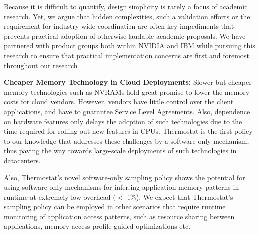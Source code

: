 %
%
Because it is difficult to quantify, design simplicity
is rarely a focus of academic research. Yet, we argue that hidden complexities,
such a validation efforts or the requirement for industry wide coordination are
often key impediments that prevents practical adoption of otherwise laudable
academic proposals.
We have partnered with
product groups both within NVIDIA and IBM while pursuing this research to ensure
that practical implementation concerns are first and foremost throughout our
research~\cite{coral2014}.

\textbf{Cheaper Memory Technology in Cloud Deployments:} Slower but cheaper
memory technologies such as NVRAMs hold great promise to lower the memory costs
for cloud vendors. However, vendors have little control over the client
applications, and have to guarantee Service Level Agreements. Also, dependence
on hardware features only delays the adoption of such technologies due to the
time required for rolling out new features in CPUs. Thermostat is the first
policy to our knowledge that addresses these challenges by a software-only
mechanism, thus paving the way towards large-scale deployments of such
technologies in datacenters.

Also, Thermostat's novel software-only sampling policy shows the potential for
using software-only mechanisms for inferring application memory patterns in
runtime at extremely low overhead ($<$ 1\%). We expect that Thermostat's
sampling policy can be employed in other scenarios that require runtime
monitoring of application access patterns, such as resource sharing between
applications, memory access profile-guided optimizations etc.
